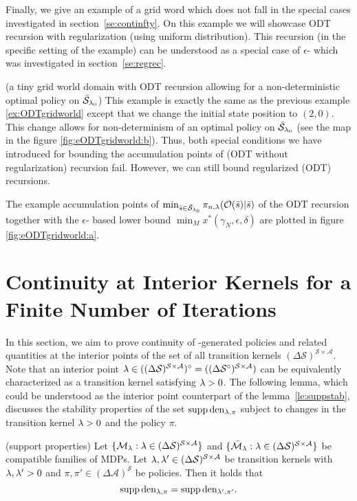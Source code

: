 Finally, we give an example of a grid word which does not fall in the special cases investigated in section~\ref{se:continfty}. On this example we will showcase ODT recursion with regularization (using uniform distribution). This recursion (in the specific setting of the example) can be understood as a special case of $\epsilon$-\eUDRL{} which was investigated in section~\ref{se:regrec}.
\begin{example}\label{ex:eODTgridworld} (a tiny grid world domain with ODT recursion allowing for a non-deterministic optimal policy on $\bar{\mathcal{S}}_{\mathit{\lambda}_0}$)
This example is exactly the same as the previous example \ref{ex:ODTgridworld} except that we change the initial state
position to $(2,0)$. This change allows for non-determinism of
an optimal policy on $\bar{\mathcal{S}}_{\mathit{\lambda}_0}$ (see the map in the figure \ref{fig:eODTgridworld:b}). Thus, both
special conditions we have introduced for bounding the accumulation points
of \eUDRL{} (ODT without regularization) recursion fail.
However, we can still bound regularized \eUDRL{} (ODT) recursions.
\end{example}
The example accumulation points of $\min_{\bar{s}\in \bar{\mathcal{S}}_{\mathit{\lambda}_0}} \pi_{n,\mathit{\lambda}} (\mathcal{O}(\bar{s})|\bar{s})$ of the ODT recursion together with the $\epsilon$-\eUDRL{} based lower bound $\min_M x^*(\gamma_N,\epsilon,\delta)$ are plotted in figure \ref{fig:eODTgridworld:a}.


\section{Continuity at Interior Kernels for a Finite Number of Iterations}
\label{ap:interiorcont}

In this section, we aim to prove continuity of \eUDRL{}-generated policies and related quantities at the interior points of the set of all transition kernels $(\Delta\mathcal{S})^{\mathcal{S}\times\mathcal{A}}$.
Note that an interior point $\mathit{\lambda} \in ((\Delta\mathcal{S})^{\mathcal{S}\times\mathcal{A}})^{\circ} = ((\Delta\mathcal{S}^{\circ})^{\mathcal{S}\times\mathcal{A}})$ can be equivalently characterized as a transition kernel satisfying $\mathit{\lambda} > 0$.
The following lemma, which could be understood as the interior point counterpart of the lemma~\ref{le:suppstab},
discusses the stability properties of the set $\operatorname*{\mathrm{supp}} \mathrm{den}_{\mathit{\lambda},\pi}$ subject to changes in the transition kernel $\mathit{\lambda}>0$ and the policy $\pi$.
\begin{lemma}(support properties)
\label{le:suppprop}
Let $\{\mathcal{M}_{\mathit{\lambda}} : \mathit{\lambda}\in (\Delta\mathcal{S})^{\mathcal{S}\times\mathcal{A}} \}$ and $\{\bar{\mathcal{M}}_{\mathit{\lambda}} : \mathit{\lambda}\in (\Delta\mathcal{S})^{\mathcal{S}\times\mathcal{A}}\}$ be compatible families of MDPs.
Let $\mathit{\lambda}, \mathit{\lambda}' \in (\Delta\mathcal{S})^{\mathcal{S}\times\mathcal{A}}$ be transition kernels with $\mathit{\lambda}, \mathit{\lambda}' > 0$ and $\pi,\pi' \in (\Delta \mathcal{A})^{\mathcal{S}}$ be policies. Then it holds that
$$
\operatorname*{\mathrm{supp}} \mathrm{den}_{\mathit{\lambda},\pi} = \operatorname*{\mathrm{supp}} \mathrm{den}_{\mathit{\lambda}',\pi'}.
$$
    
\end{lemma}

